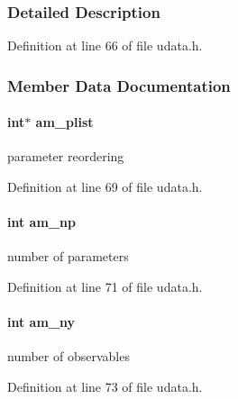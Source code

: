 \subsubsection{Detailed Description}


Definition at line 66 of file udata.\+h.



\subsubsection{Member Data Documentation}
\hypertarget{struct_user_data_a122fcb4f213656e29d30e1e8713fcf1c}{}
\paragraph[{am\+\_\+plist}]{\setlength{\rightskip}{0pt plus 5cm}int$\ast$ am\+\_\+plist}\label{struct_user_data_a122fcb4f213656e29d30e1e8713fcf1c}
parameter reordering 

Definition at line 69 of file udata.\+h.

\hypertarget{struct_user_data_a1b32993ff88dfae4dd2aab311c24cc26}{}
\paragraph[{am\+\_\+np}]{\setlength{\rightskip}{0pt plus 5cm}int am\+\_\+np}\label{struct_user_data_a1b32993ff88dfae4dd2aab311c24cc26}
number of parameters 

Definition at line 71 of file udata.\+h.

\hypertarget{struct_user_data_a1c8d4eb301c60c34dc4870faca7ce5a4}{}
\paragraph[{am\+\_\+ny}]{\setlength{\rightskip}{0pt plus 5cm}int am\+\_\+ny}\label{struct_user_data_a1c8d4eb301c60c34dc4870faca7ce5a4}
number of observables 

Definition at line 73 of file udata.\+h.

\hypertarget{struct_user_data_a00ba9cf99f8f02b663241bb76b76ce96}{}
